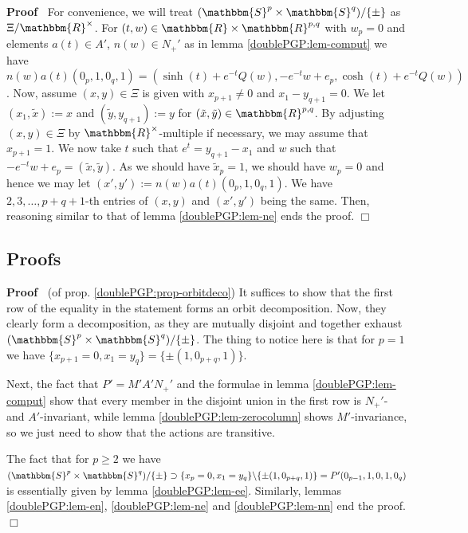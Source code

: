 \documentclass{article}
\newcommand{\assign}{:=}
\newenvironment{proof}{\noindent\textbf{Proof\ }}{\hspace*{\fill}$\Box$\medskip}
\numberwithin{definition}{section}
\numberwithin{lemma}{section}
\numberwithin{proposition}{section}
{\theorembodyfont{\rmfamily}\newtheorem{remark}{Remark}
\numberwithin{remark}{section}
}
\begin{document}
\begin{proof}
  For convenience, we will treat $( \mathbbm{S}^p \times \mathbbm{S}^q) / \{
  \pm \}$ as $\Xi /\mathbbm{R}^{\times}$. For $( t, w) \in \mathbbm{R} \times
  \mathbbm{R}^{p, q}$ with $w_p = 0$ and elements $a ( t) \in A'$, $n ( w) \in
  N_+'$ as in lemma \ref{doublePGP:lem-comput} we have $n ( w) a ( t) ( 0_p,
  1, 0_q, 1) = ( \sinh ( t) + e^{- t} Q ( w), - e^{- t} w + e_p, \cosh ( t) +
  e^{- t} Q ( w))$. Now, assume $( x, y) \in \Xi$ is given with $x_{p + 1}
  \neq 0$ and $x_1 - y_{q + 1} = 0$. We let $( x_1, \tilde{x}) \assign x$ and
  $( \tilde{y}, y_{q + 1}) \assign y$ for $( \tilde{x}, \tilde{y}) \in
  \mathbbm{R}^{p, q}$. By adjusting $( x, y) \in \Xi$ by
  $\mathbbm{R}^{\times}$-multiple if necessary, we may assume that $x_{p + 1}
  = 1$. We now take $t$ such that $e^t = y_{q + 1} - x_1$ and $w$ such that $-
  e^{- t} w + e_p = ( \tilde{x}, \tilde{y})$. As we should have $\tilde{x}_p =
  1$, we should have $w_p = 0$ and hence we may let $( x', y') \assign n ( w)
  a ( t) ( 0_p, 1, 0_q, 1)$. We have $2, 3, \ldots, p + q + 1$-th entries of
  $( x, y)$ and $( x', y')$ being the same. Then, reasoning similar to that of
  lemma \ref{doublePGP:lem-ne} ends the proof.
\end{proof}

\subsection{Proofs}

\begin{proof}
  (of prop. \ref{doublePGP:prop-orbitdeco}) It suffices to show that the first
  row of the equality in the statement forms an orbit decomposition. Now, they
  clearly form a decomposition, as they are mutually disjoint and together
  exhaust $( \mathbbm{S}^p \times \mathbbm{S}^q) / \{ \pm \}$. The thing to
  notice here is that for $p = 1$ we have $\{ x_{p + 1} = 0, x_1 = y_q \} = \{
  \pm ( 1, 0_{p + q}, 1) \}$.
  
  Next, the fact that $P' = M' A' N_+'$ and the formulae in lemma
  \ref{doublePGP:lem-comput} show that every member in the disjoint union in
  the first row is $N_+'$- and $A'$-invariant, while lemma
  \ref{doublePGP:lem-zerocolumn} shows $M'$-invariance, so we just need to
  show that the actions are transitive.
  
  The fact that for $p \geqslant 2$ we have $( \mathbbm{S}^p \times
  \mathbbm{S}^q) / \{ \pm \} \supset \{ x_p = 0, x_1 = y_q \} \backslash \{
  \pm ( 1, 0_{p + q}, 1) \} = P' ( 0_{p - 1}, 1, 0, 1, 0_q)$ is essentially
  given by lemma \ref{doublePGP:lem-ee}. Similarly, lemmas
  \ref{doublePGP:lem-en}, \ref{doublePGP:lem-ne} and \ref{doublePGP:lem-nn}
  end the proof.
\end{proof}
\end{document}
